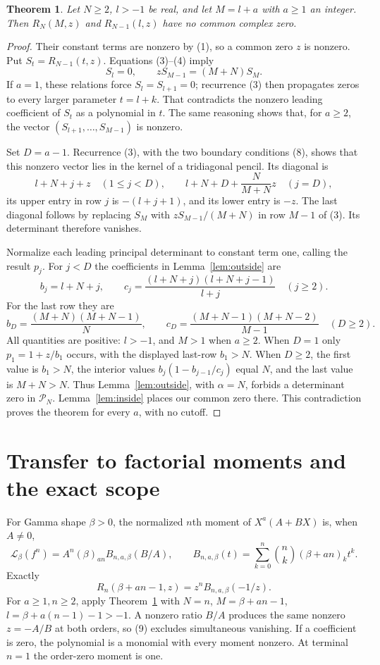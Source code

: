 \documentclass[11pt]{article}
\newtheorem{theorem}{Theorem}
\begin{document}
\begin{theorem}\label{thm:coprime}
Let $N\ge2$, $l>-1$ be real, and let $M=l+a$ with $a\ge1$ an integer.
Then $R_N(M,z)$ and $R_{N-1}(l,z)$ have no common complex zero.
\end{theorem}
\begin{proof}
Their constant terms are nonzero by (1), so a common zero $z$ is nonzero.
Put $S_t=R_{N-1}(t,z)$. Equations (3)--(4) imply
\[
 S_l=0,\qquad zS_{M-1}=(M+N)S_M.                            \tag{8}
\]
If $a=1$, these relations force $S_l=S_{l+1}=0$; recurrence (3)
then propagates zeros to every larger parameter $t=l+k$.
That contradicts the nonzero leading coefficient of $S_t$ as a polynomial
in $t$. The same reasoning shows that, for $a\ge2$, the vector
$(S_{l+1},\ldots,S_{M-1})$ is nonzero.

Set $D=a-1$. Recurrence (3), with the two boundary conditions (8),
shows that this nonzero vector lies in the kernel of a tridiagonal
pencil. Its diagonal is
\[
 l+N+j+z\quad(1\le j<D),\qquad
                   l+N+D+\frac{N}{M+N}z\quad(j=D),
\]
its upper entry in row $j$ is $-(l+j+1)$, and its lower entry is $-z$.
The last diagonal follows by replacing $S_M$ with
$zS_{M-1}/(M+N)$ in row $M-1$ of (3).
Its determinant therefore vanishes.

Normalize each leading principal determinant to constant term one,
calling the result $p_j$. For $j<D$ the coefficients in
Lemma~\ref{lem:outside} are
\[
 b_j=l+N+j,\qquad
 c_j=\frac{(l+N+j)(l+N+j-1)}{l+j}\quad(j\ge2).
\]
For the last row they are
\[
 b_D=\frac{(M+N)(M+N-1)}{N},\qquad
 c_D=\frac{(M+N-1)(M+N-2)}{M-1}\quad(D\ge2).
\]
All quantities are positive: $l>-1$, and $M>1$ when $a\ge2$.
When $D=1$ only $p_1=1+z/b_1$ occurs, with the displayed last-row $b_1>N$.
When $D\ge2$, the first value is $b_1>N$, the interior values
$b_j(1-b_{j-1}/c_j)$ equal $N$, and the last value is $M+N>N$.
Thus Lemma~\ref{lem:outside}, with $\alpha=N$, forbids a determinant zero
in $\mathcal P_N$. Lemma~\ref{lem:inside} places our common zero there.
This contradiction proves the theorem for every $a$, with no cutoff.
\end{proof}

\section{Transfer to factorial moments and the exact scope}
For Gamma shape $\beta>0$, the normalized $n$th moment of
$X^a(A+BX)$ is, when $A\ne0$,
\[
 \mathcal L_\beta(f^n)=A^n(\beta)_{an}B_{n,a,\beta}(B/A),\qquad
 B_{n,a,\beta}(t)=\sum_{k=0}^n\binom nk(\beta+an)_k t^k.
\]
Exactly
\[
 R_n(\beta+an-1,z)=z^n B_{n,a,\beta}(-1/z).                  \tag{9}
\]
For $a\ge1,n\ge2$, apply Theorem~\ref{thm:coprime} with
$N=n$, $M=\beta+an-1$, $l=\beta+a(n-1)-1>-1$.
A nonzero ratio $B/A$ produces the same nonzero $z=-A/B$ at both
orders, so (9) excludes simultaneous vanishing. If a coefficient is
zero, the polynomial is a monomial with every moment nonzero.
At terminal $n=1$ the order-zero moment is one.
\end{document}
